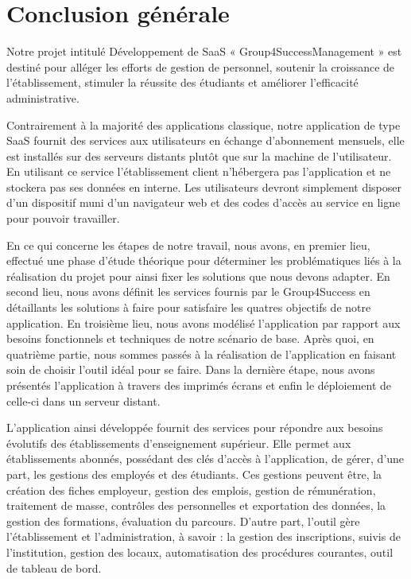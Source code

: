 \chapter*{Conclusion générale}

Notre projet intitulé Développement de SaaS « Group4SuccessManagement » est destiné
pour alléger les efforts de gestion de personnel, soutenir la croissance de l’établissement,
stimuler la réussite des étudiants et améliorer l'efficacité administrative.
\medskip

Contrairement à la majorité des applications classique, notre application de type SaaS
fournit des services aux utilisateurs en échange d'abonnement mensuels, elle est installés
sur des serveurs distants plutôt que sur la machine de l'utilisateur. En utilisant ce service
l’établissement client n'hébergera pas l'application et ne stockera pas ses données en
interne. Les utilisateurs devront simplement disposer d’un dispositif muni d'un navigateur web et des codes d’accès au service en ligne pour pouvoir travailler.
\medskip

En ce qui concerne les étapes de notre travail, nous avons, en premier lieu, effectué
une phase d’étude théorique pour déterminer les problématiques liés à la réalisation
du projet pour ainsi fixer les solutions que nous devons adapter. En second lieu, nous
avons définit les services fournis par le Group4Success en détaillants les solutions à
faire pour satisfaire les quatres objectifs de notre application. En troisième lieu, nous
avons modélisé l’application par rapport aux besoins fonctionnels et techniques de notre
scénario de base. Après quoi, en quatrième partie, nous sommes passés à la réalisation de
l’application en faisant soin de choisir l'outil idéal pour se faire. Dans la dernière étape, nous avons présentés l'application à travers des imprimés écrans et enfin le déploiement de celle-ci dans un serveur distant.
\medskip

L'application ainsi développée fournit des services pour répondre aux besoins évolutifs des établissements d'enseignement supérieur. Elle permet aux établissements abonnés, possédant des clés d'accès à l'application, de gérer, d'une part, les gestions des employés et des étudiants. Ces gestions peuvent être, la création des fiches employeur, gestion des emplois, gestion de rémunération, traitement de masse, contrôles des personnelles et exportation des données, la gestion des formations, évaluation du parcours.
D'autre part, l'outil gère l'établissement et l'administration, à savoir : la gestion des inscriptions, suivis de l'institution, gestion des locaux, automatisation des procédures courantes, outil de tableau de bord.
\medskip

